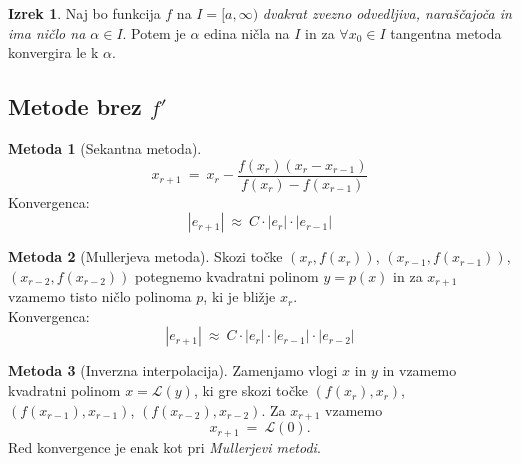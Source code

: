 \documentclass[11pt]{article}
\theoremstyle{definition}
\newtheorem{izrek}{Izrek}
\newtheorem*{metoda}{Metoda}
\begin{document}
\begin{izrek}

Naj bo funkcija $f$ na $I = [a, \infty)$ \textit{dvakrat zvezno odvedljiva, naraščajoča in ima ničlo na $\alpha \in I$}. Potem je $\alpha$ edina ničla na $I$ in za $\forall x_0 \in I$ tangentna metoda konvergira le k $\alpha$.

\end{izrek}
\vspace{0.5cm}


\subsection{Metode brez $f'$}
\vspace{0.5cm}


\begin{metoda}[Sekantna metoda]

$$x_{r+1} ~=~ x_r - \frac{f(x_r)(x_r - x_{r-1})}{f(x_r) - f(x_{r-1})}$$
Konvergenca:
$$|e_{r+1}| ~\approx~ C \cdot |e_r| \cdot |e_{r-1}|$$

\end{metoda}
\vspace{0.5cm}

\begin{metoda}[Mullerjeva metoda]

Skozi točke $(x_r, f(x_r))$, $(x_{r-1}, f(x_{r-1}))$, \\$(x_{r-2}, f(x_{r-2}))$ potegnemo kvadratni polinom $y = p(x)$ in za $x_{r+1}$ vzamemo tisto ničlo polinoma $p$, ki je bližje $x_r$. \\

\noindent Konvergenca:
$$|e_{r+1}| ~\approx~ C \cdot |e_r| \cdot |e_{r-1}| \cdot |e_{r-2}|$$

\end{metoda}
\vspace{0.5cm}

\begin{metoda}[Inverzna interpolacija]

Zamenjamo vlogi $x$ in $y$ in vzamemo kvadratni polinom $x = \mathcal{L}(y)$, ki gre skozi točke $(f(x_r), x_r)$, $(f(x_{r-1}), x_{r-1})$, $(f(x_{r-2}), x_{r-2})$. Za $x_{r+1}$ vzamemo
$$x_{r+1} ~=~ \mathcal{L}(0).$$
Red konvergence je enak kot pri \textit{Mullerjevi metodi}.

\end{metoda}
\vspace{0.5cm}
\end{document}
